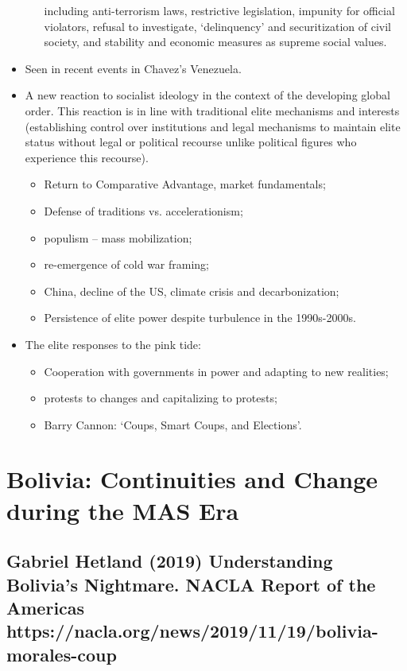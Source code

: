 \documentclass{article}
\begin{document}
\begin{itemize}
\begin{itemize}
            including anti-terrorism laws, restrictive legislation, impunity
            for official violators, refusal to investigate, `delinquency'
            and securitization of civil society, and stability and economic
            measures as supreme social values.
        \end{itemize}
        \item Seen in recent events in Chavez's Venezuela.
        \item A new reaction to socialist ideology in the context of the
        developing global order. This reaction is in line with traditional
        elite mechanisms and interests (establishing control over
        institutions and legal mechanisms to maintain elite status without
        legal or political recourse unlike political figures who experience
        this recourse).
        \begin{itemize}
            \item Return to Comparative Advantage, market fundamentals;
            \item Defense of traditions vs. accelerationism;
            \item populism -- mass mobilization;
            \item re-emergence of cold war framing;
            \item China, decline of the US, climate crisis and decarbonization;
            \item Persistence of elite power despite turbulence in the
            1990s-2000s.
        \end{itemize}
        \item The elite responses to the pink tide:
        \begin{itemize}
            \item Cooperation with governments in power and adapting to new
            realities;
            \item protests to changes and capitalizing to protests;
            \item Barry Cannon: `Coups, Smart Coups, and Elections'.
        \end{itemize}
    \end{itemize}

    \section{Bolivia: Continuities and Change during the MAS Era}

    \subsection{Gabriel Hetland (2019) Understanding Bolivia’s Nightmare. NACLA Report of the Americas https://nacla.org/news/2019/11/19/bolivia-morales-coup}
\end{document}
